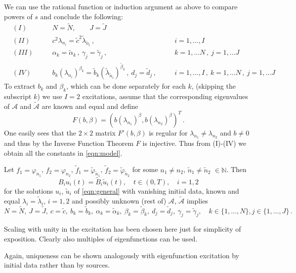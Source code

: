 We can use the rational function or induction argument as above to compare powers of $s$ and conclude the following:
\[
\begin{aligned}
&(I)\qquad&&N=\tilde{N},\qquad J=\tilde{J}\\
&(II)&&c^2\lambda_{n_i}=\tilde{c}^2\tilde{\lambda}_{\tilde{n}_i}\,, \quad&& i=1,\ldots,I\\
&(III)&&\alpha_k=\tilde{\alpha}_k\,,\ \gamma_j=\tilde{\gamma}_j\,, &&k=1,\ldots N\,, \ j=1,\ldots J\\
&(IV)&&b_k(\lambda_{n_i})^{\beta_{k}}
=\tilde{b}_k(\tilde{\lambda}_{\tilde{n}_i})^{\tilde{\beta}_{k}}\,, \ d_j=\tilde{d}_j\,, \quad 
&&i=1,\ldots,I\,, \ k=1,\ldots N\,, \ j=1,\ldots J
\end{aligned}
\]
To extract $b_k$ and $\beta_k$, which can be done separately for each $k$, (skipping the subscript $k$) we use $I=2$ excitations, assume that the corresponding eigenvalues of $\mathcal{A}$ and $\tilde{\mathcal{A}}$ are known and equal and define 
\[
F(b,\beta)=
(b(\lambda_{n_1})^\beta,b(\lambda_{n_2})^\beta)^T\,.
\]
One easily sees that the $2\times2$ matrix $F'(b,\beta)$ is regular for $\lambda_{n_1}\neq\lambda_{n_2}$ and $b\not=0$ and thus by the Inverse Function Theorem $F$ is injective. Thus from (I)-(IV) we obtain all the constants in \eqref{eqn:model}.

\begin{theorem}\label{thm:uniqueness_singlemode}
Let $f_1=\varphi_{n_1}$, $f_2=\varphi_{n_2}$, $\tilde{f}_1=\tilde{\varphi}_{\tilde{n}_1}$, $\tilde{f}_2=\tilde{\varphi}_{\tilde{n}_2}$ for some $n_1\not=n_2$, $\tilde{n}_1\not=\tilde{n}_2$ $\in\mathbb{N}$.
Then 
\[
B_i u_i(t) = \tilde B_i \tilde u_i(t), \quad t\in(0,T),\quad i=1,2
\]
for the solutions $u_i$, $\tilde{u}_i$ of \eqref{eqn:general}
with vanishing initial data, known and equal $\lambda_i=\tilde{\lambda}_i$, $i=1,2$ and possibly unknown (rest of) $\mathcal{A}$, $\tilde{\mathcal{A}}$
implies
\[
N=\tilde{N}, \ J=\tilde{J}, \ c=\tilde{c}, \ b_k=\tilde{b}_k, \ \alpha_k=\tilde{\alpha}_k, \ \beta_{k}=\tilde{\beta}_k, \ d_j=\tilde{d}_j, \ \gamma_j=\tilde{\gamma}_j,\quad k\in\{1,\ldots,N\}, j\in\{1,\ldots,J\}\,. 
\]
\end{theorem}

\begin{remark}
Scaling with unity in the excitation has been chosen here just for simplicity of exposition. Clearly also multiples of eigenfunctions can be used.

Again, uniqueness can be shown analogously with eigenfunction excitation by initial data rather than by sources.
\end{remark}

